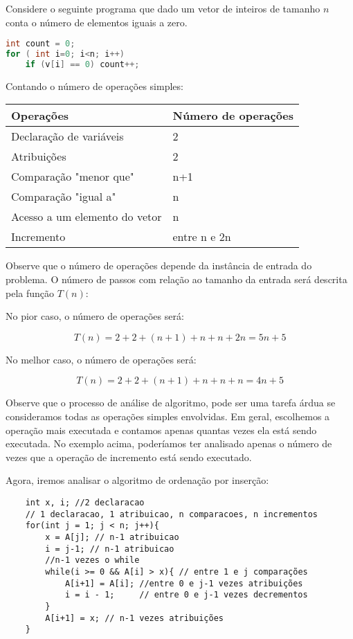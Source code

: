 Considere o seguinte programa que dado um vetor de inteiros de tamanho $n$ conta o número de elementos iguais a zero.

\begin{lstlisting}[language=C, caption={primeiro programa}]
int count = 0;
for ( int i=0; i<n; i++)
    if (v[i] == 0) count++;
\end{lstlisting}

Contando o número de operações simples:

\begin{tabular}{|l|l|}
\hline
Operações & Número de operações\\
\hline
Declaração de variáveis & 2\\
\hline
Atribuições &  2\\
\hline
Comparação "menor que" & n+1\\
\hline
Comparação "igual a" & n\\
\hline
Acesso a um elemento do vetor & n\\
\hline
Incremento & entre n e 2n\\
\hline
\end{tabular}

Observe que o número de operações depende da instância de entrada do problema. O número de passos com relação ao tamanho da entrada será descrita pela função $T(n)$:


No pior caso, o número de operações será:

$$
T(n) = 2 + 2 + (n+1) + n+ n + 2n = 5n + 5
$$

No melhor caso, o número de operações será:

$$
T(n) = 2 + 2 + (n+1) + n+ n + n = 4n + 5
$$

Observe que o processo de análise de algoritmo, pode ser uma tarefa árdua se consideramos todas as operações simples envolvidas. Em geral, escolhemos a operação mais executada e contamos apenas quantas vezes ela está sendo executada. No exemplo acima, poderíamos ter analisado apenas o número de vezes que a operação de incremento está sendo executado.

Agora, iremos analisar o algoritmo de ordenação por inserção:

\begin{verbatim}
    int x, i; //2 declaracao
    // 1 declaracao, 1 atribuicao, n comparacoes, n incrementos 
    for(int j = 1; j < n; j++){ 
        x = A[j]; // n-1 atribuicao
        i = j-1; // n-1 atribuicao
        //n-1 vezes o while
        while(i >= 0 && A[i] > x){ // entre 1 e j comparações  
            A[i+1] = A[i]; //entre 0 e j-1 vezes atribuições
            i = i - 1;     // entre 0 e j-1 vezes decrementos
        }
        A[i+1] = x; // n-1 vezes atribuições
    }
\end{verbatim}

